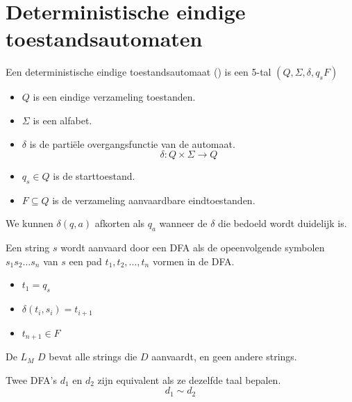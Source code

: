\documentclass[main.tex]{subfiles}
\begin{document}
\section{Deterministische eindige toestandsautomaten}
\begin{de}
  Een deterministische eindige toestandsautomaat () is een 5-tal $(Q,\Sigma,\delta,q_{s}F)$
  \begin{itemize}
  \item $Q$ is een eindige verzameling toestanden.
  \item $\Sigma$ is een alfabet.
  \item $\delta$ is de parti\"ele overgangsfunctie van de automaat.
  \[ \delta: Q \times \Sigma \rightarrow Q \]
  \item $q_{s} \in Q$ is de starttoestand.
  \item $F \subseteq Q$ is de verzameling aanvaardbare eindtoestanden.
  \end{itemize}
\end{de}

\begin{de}
  We kunnen $\delta(q,a)$ afkorten als $q_{a}$ wanneer de $\delta$ die bedoeld wordt duidelijk is.  
\end{de}

\begin{de}
  Een string $s$ wordt aanvaard door een DFA als de opeenvolgende symbolen $s_{1}s_{2}\dotsc s_{n}$ van $s$ een pad $t_{1},t_{2},\dotsc,t_{n}$ vormen in de DFA.
  \begin{itemize}
  \item $t_{1} = q_{s}$
  \item $\delta(t_{i},s_{i}) = t_{i+1}$
  \item $t_{n+1} \in F$
  \end{itemize}
\end{de}

\begin{de}
  De  $L_{M}$  $D$ bevat alle strings die $D$ aanvaardt, en geen andere strings.
\end{de}

\begin{de}
  Twee DFA's $d_{1}$ en $d_{2}$ zijn equivalent als ze dezelfde taal bepalen.
  \[ d_{1} \sim d_{2} \]
\end{de}
\end{document}

